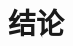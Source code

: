 \documentclass[bachelor,print,msfonts]{xduthesis}
\begin{document}
\mainmatter
\fi
\chapter{结论}
\label{cha:conclusions}


\ifx\allfiles\undefined
\end{document}
